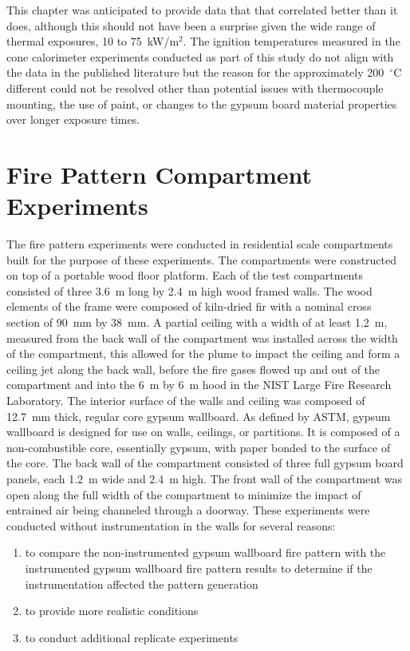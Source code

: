 \documentclass[twoside]{uocthesis}
\begin{document}
{This chapter was anticipated to provide data that that correlated better than it does, although this should not have been a surprise given the wide range of thermal exposures, 10 to 75~kW/m$^2$.  The ignition temperatures measured in the cone calorimeter experiments conducted as part of this study do not align with the data in the published literature but the reason for the approximately 200~$^{\circ}$C different could not be resolved other than potential issues with thermocouple mounting, the use of paint, or changes to the gypsum board material properties over longer exposure times.       

\chapter{Fire Pattern Compartment Experiments}

The fire pattern experiments were conducted in residential scale compartments built for the purpose of these experiments.  The compartments were constructed on top of a portable wood floor platform.  Each of the test compartments consisted of three 3.6~m long by 2.4~m high wood framed walls. The wood elements of the frame were composed of kiln-dried fir with a nominal cross section of 90~mm by 38~mm.  A partial ceiling with a width of at least 1.2~m, measured from the back wall of the compartment was installed across the width of the compartment, this allowed for the plume to impact the ceiling and form a ceiling jet along the back wall, before the fire gases flowed up and out of the compartment and into the 6~m by 6~m hood in the NIST Large Fire Research Laboratory. The interior surface of the walls and ceiling was composed of 12.7~mm thick, regular core gypsum wallboard. As defined by ASTM, gypsum wallboard is designed for use on walls, ceilings, or partitions.  It is composed of a non-combustible core, essentially gypsum, with paper bonded to the surface of the core. The back wall of the compartment consisted of three full gypsum board panels, each 1.2~m wide and 2.4~m high.  The front wall of the compartment was open along the full width of the compartment to minimize the impact of entrained air being channeled through a doorway. These experiments were conducted without instrumentation in the walls for several reasons:
\begin{enumerate}
\item to compare the non-instrumented gypsum wallboard fire pattern with the instrumented gypsum wallboard fire pattern results to determine if the instrumentation affected the pattern generation
\item to provide more realistic conditions
\item to conduct additional replicate experiments
\end{enumerate}

}
\end{document}
